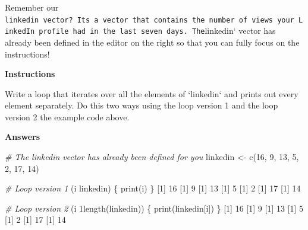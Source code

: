 \documentclass[]{article}
\newcommand{\hlnum}[1]{\textcolor[rgb]{0.816,0.125,0.439}{#1}}%
\newcommand{\hlstr}[1]{\textcolor[rgb]{0.251,0.627,0.251}{#1}}%
\newcommand{\hlcom}[1]{\textcolor[rgb]{0.502,0.502,0.502}{\textit{#1}}}%
\newcommand{\hlstd}[1]{\textcolor[rgb]{0.251,0.251,0.251}{#1}}%
\newcommand{\hlkwc}[1]{\textcolor[rgb]{0.251,0.251,0.251}{#1}}%
\newcommand{\hlkwd}[1]{\textcolor[rgb]{0.878,0.439,0.125}{#1}}%
\newenvironment{Shaded}{\begin{myshaded}}{\end{myshaded}}
\newcommand{\KeywordTok}[1]{\hlkwd{#1}}
\newcommand{\DataTypeTok}[1]{\hlkwc{#1}}
\newcommand{\DecValTok}[1]{\hlnum{#1}}
\newcommand{\StringTok}[1]{\hlstr{#1}}
\newcommand{\CommentTok}[1]{\hlcom{#1}}
\newcommand{\NormalTok}[1]{\hlstd{#1}}
\begin{document}
Remember our
\texttt{linkedin\ vector?\ It\textquotesingle{}s\ a\ vector\ that\ contains\ the\ number\ of\ views\ your\ LinkedIn\ profile\ had\ in\ the\ last\ seven\ days.\ The}linkedin`
vector has already been defined in the editor on the right so that you
can fully focus on the instructions!

\textbf{Instructions}

\begin{Shaded}
\begin{Highlighting}[]
\NormalTok{Write a }\NormalTok{ loop that iterates over all the elements of }\StringTok{`}\DataTypeTok{linkedin}\StringTok{`}\NormalTok{ and prints out every element separately. Do this }\NormalTok{ two ways}\OperatorTok{:}\StringTok{ }\NormalTok{using the loop version }\DecValTok{1}\NormalTok{ and the loop version }\DecValTok{2} \NormalTok{ the example code above.}
\end{Highlighting}
\end{Shaded}

\textbf{Answers}

\begin{Shaded}
\begin{Highlighting}[]
\CommentTok{# The linkedin vector has already been defined for you}
\NormalTok{linkedin <-}\StringTok{ }\KeywordTok{c}\NormalTok{(}\DecValTok{16}\NormalTok{, }\DecValTok{9}\NormalTok{, }\DecValTok{13}\NormalTok{, }\DecValTok{5}\NormalTok{, }\DecValTok{2}\NormalTok{, }\DecValTok{17}\NormalTok{, }\DecValTok{14}\NormalTok{)}

\CommentTok{# Loop version 1}
\NormalTok{ (i }\NormalTok{ linkedin) \{}
  \KeywordTok{print}\NormalTok{(i)}
\NormalTok{\}}
\NormalTok{   [}\DecValTok{1}\NormalTok{] }\DecValTok{16}
\NormalTok{   [}\DecValTok{1}\NormalTok{] }\DecValTok{9}
\NormalTok{   [}\DecValTok{1}\NormalTok{] }\DecValTok{13}
\NormalTok{   [}\DecValTok{1}\NormalTok{] }\DecValTok{5}
\NormalTok{   [}\DecValTok{1}\NormalTok{] }\DecValTok{2}
\NormalTok{   [}\DecValTok{1}\NormalTok{] }\DecValTok{17}
\NormalTok{   [}\DecValTok{1}\NormalTok{] }\DecValTok{14}


\CommentTok{# Loop version 2}
\NormalTok{(i } \DecValTok{1}\OperatorTok{:}\KeywordTok{length}\NormalTok{(linkedin)) \{}
  \KeywordTok{print}\NormalTok{(linkedin[i])}
\NormalTok{\}}
\NormalTok{   [}\DecValTok{1}\NormalTok{] }\DecValTok{16}
\NormalTok{   [}\DecValTok{1}\NormalTok{] }\DecValTok{9}
\NormalTok{   [}\DecValTok{1}\NormalTok{] }\DecValTok{13}
\NormalTok{   [}\DecValTok{1}\NormalTok{] }\DecValTok{5}
\NormalTok{   [}\DecValTok{1}\NormalTok{] }\DecValTok{2}
\NormalTok{   [}\DecValTok{1}\NormalTok{] }\DecValTok{17}
\NormalTok{   [}\DecValTok{1}\NormalTok{] }\DecValTok{14}
\end{Highlighting}
\end{Shaded}
\end{document}
